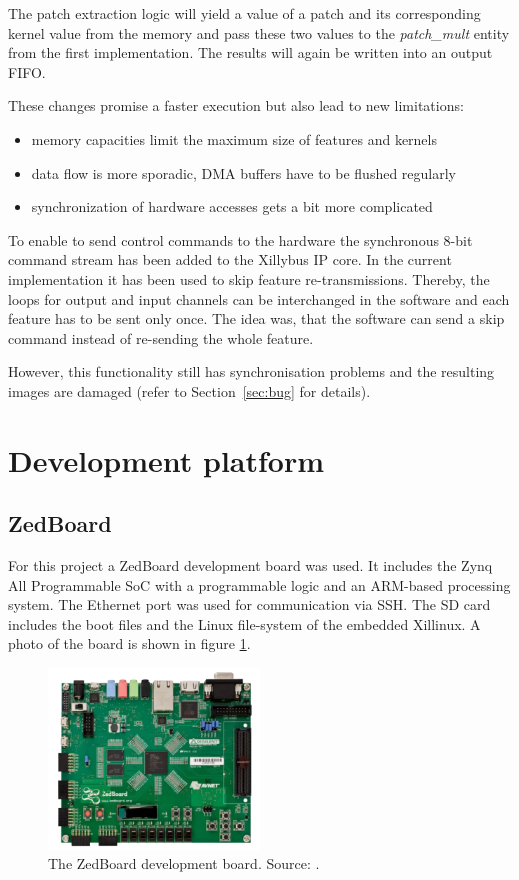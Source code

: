 \documentclass[
			fontsize = 12pt,
			paper = a4
			]
			{scrartcl}%
\newcommand{\?}{\ensuremath{^\texttt{\textbf [CITATION~NEEDED]}}}
\begin{document}
The patch extraction logic will yield a value of a patch and its corresponding kernel value from the memory and pass these two values to the \emph{patch\_mult} entity from the first implementation.
The results will again be written into an output FIFO.

These changes promise a faster execution but also lead to new limitations: 
\begin{itemize}
  \item memory capacities limit the maximum size of features and kernels
  \item data flow is more sporadic, DMA buffers have to be flushed regularly
  \item synchronization of hardware accesses gets a bit more complicated
\end{itemize}

To enable to send control commands to the hardware the synchronous 8-bit command stream has been added to the Xillybus IP core.
In the current implementation it has been used to skip feature re-transmissions.
Thereby, the loops for output and input channels can be interchanged in the software and each feature has to be sent only once.
The idea was, that the software can send a skip command instead of re-sending the whole feature.

However, this functionality still has synchronisation problems and the resulting images are damaged (refer to Section~\ref{sec:bug} for details).

\newpage
\section{Development platform}
\label{sec:fpga}

\subsection{ZedBoard}
\label{sec:zedboard}
For this project a ZedBoard development board was used. It includes the Zynq All Programmable SoC with a programmable logic and an ARM\textregistered-based processing system. The Ethernet port was used for communication via SSH. The SD card includes the boot files and the Linux file-system of the embedded Xillinux. A photo of the board is shown in figure \ref{fig:zedboard}.

\begin{figure}[H]
    \centering
    \includegraphics[width=0.5\textwidth]{fig/ZedBoard.png}
    \caption{The ZedBoard development board.  Source: \cite{zedboard}.}
    \label{fig:zedboard}
\end{figure}
\end{document}
